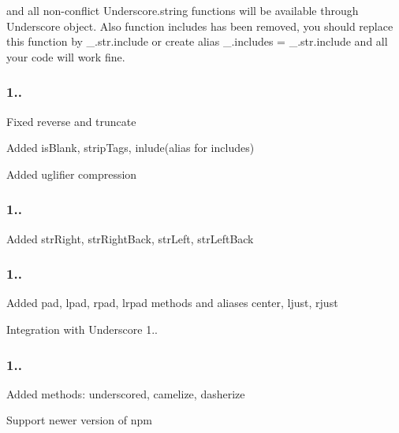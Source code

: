 and all non-\/conflict Underscore.\+string functions will be available through Underscore object. Also function {\ttfamily includes} has been removed, you should replace this function by {\ttfamily \+\_\+.\+str.\+include} or create alias {\ttfamily \+\_\+.\+includes = \+\_\+.\+str.\+include} and all your code will work fine.

\subsubsection*{1..}


\begin{DoxyItemize}
\item Fixed reverse and truncate
\item Added is\+Blank, strip\+Tags, inlude(alias for includes)
\item Added uglifier compression
\end{DoxyItemize}

\subsubsection*{1..}


\begin{DoxyItemize}
\item Added str\+Right, str\+Right\+Back, str\+Left, str\+Left\+Back
\end{DoxyItemize}

\subsubsection*{1..}


\begin{DoxyItemize}
\item Added pad, lpad, rpad, lrpad methods and aliases center, ljust, rjust
\item Integration with Underscore 1..
\end{DoxyItemize}

\subsubsection*{1..}


\begin{DoxyItemize}
\item Added methods\+: underscored, camelize, dasherize
\item Support newer version of npm
\end{DoxyItemize}


